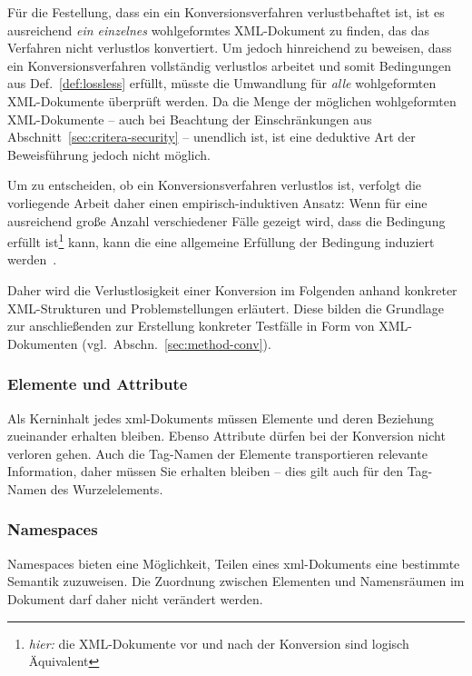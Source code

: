 Für die Festellung, dass ein ein Konversionsverfahren verlustbehaftet ist, ist es ausreichend \emph{ein einzelnes} wohlgeformtes XML-Dokument zu finden, das das Verfahren nicht verlustlos konvertiert. Um jedoch hinreichend zu beweisen, dass ein Konversionsverfahren vollständig verlustlos arbeitet und somit Bedingungen aus Def.~\ref{def:lossless} erfüllt, müsste die Umwandlung für \emph{alle} wohlgeformten XML-Dokumente überprüft werden. Da die Menge der möglichen wohlgeformten XML-Dokumente  -- auch bei Beachtung der Einschränkungen aus Abschnitt~\ref{sec:critera-security} -- unendlich ist, ist eine deduktive Art der Beweisführung jedoch nicht möglich.

Um zu entscheiden, ob ein Konversionsverfahren verlustlos ist, verfolgt die vorliegende Arbeit daher einen empirisch-induktiven Ansatz: Wenn für eine ausreichend große Anzahl verschiedener Fälle gezeigt wird, dass die Bedingung erfüllt ist\footnote{\emph{hier:} die XML-Dokumente vor und nach der Konversion sind logisch Äquivalent} kann, kann die eine allgemeine Erfüllung der Bedingung induziert werden~\cite[S.~2]{rudner1953judgments}.

Daher wird die Verlustlosigkeit einer Konversion im Folgenden anhand konkreter XML-Strukturen und Problemstellungen erläutert. Diese bilden die Grundlage zur anschließenden zur Erstellung konkreter Testfälle in Form von XML-Dokumenten (vgl.~Abschn.~\ref{sec:method-conv}).

\subsubsection{Elemente und Attribute}

Als Kerninhalt jedes \acrshort{xml}\hyp{}Dokuments müssen Elemente und deren Beziehung zueinander erhalten bleiben. Ebenso Attribute dürfen bei der Konversion nicht verloren gehen. Auch die Tag\hyp{}Namen der Elemente transportieren relevante Information, daher müssen Sie erhalten bleiben -- dies gilt auch für den Tag\hyp{}Namen des Wurzelelements.

\subsubsection{Namespaces}

Namespaces bieten eine Möglichkeit, Teilen eines \acrshort{xml}-Dokuments eine bestimmte Semantik zuzuweisen. Die Zuordnung zwischen Elementen und Namensräumen im Dokument darf daher nicht verändert werden.

